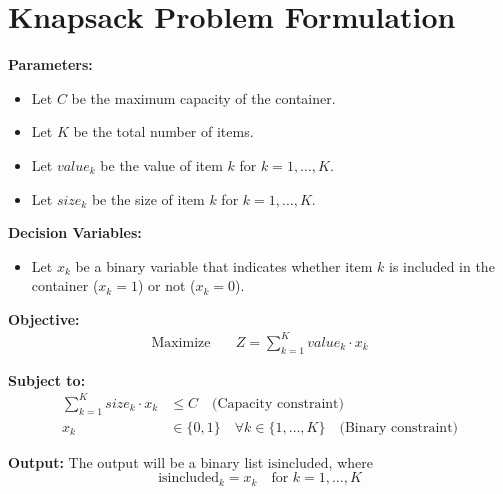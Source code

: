 \documentclass{article}
\begin{document}
\section*{Knapsack Problem Formulation}

\textbf{Parameters:}
\begin{itemize}
    \item Let \( C \) be the maximum capacity of the container.
    \item Let \( K \) be the total number of items.
    \item Let \( value_k \) be the value of item \( k \) for \( k = 1, \ldots, K \).
    \item Let \( size_k \) be the size of item \( k \) for \( k = 1, \ldots, K \).
\end{itemize}

\textbf{Decision Variables:}
\begin{itemize}
    \item Let \( x_k \) be a binary variable that indicates whether item \( k \) is included in the container (\( x_k = 1 \)) or not (\( x_k = 0 \)).
\end{itemize}

\textbf{Objective:}
\begin{align*}
\text{Maximize} \quad & Z = \sum_{k=1}^{K} value_k \cdot x_k
\end{align*}

\textbf{Subject to:}
\begin{align*}
\sum_{k=1}^{K} size_k \cdot x_k & \leq C \quad \text{(Capacity constraint)} \\
x_k & \in \{0, 1\} \quad \forall k \in \{1, \ldots, K\} \quad \text{(Binary constraint)}
\end{align*}

\textbf{Output:}
The output will be a binary list \( \text{isincluded} \), where 
\[
\text{isincluded}_k = x_k \quad \text{for } k = 1, \ldots, K
\]
\end{document}
